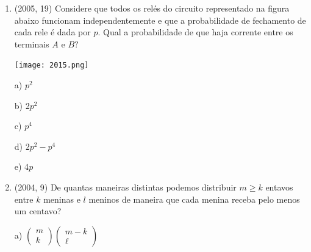 \documentclass{article}
\begin{document}
\begin{enumerate}
c) 48

d) 47

e) 16 \newline

\textbf{RESOLUÇÃO}

$\rule[1cm]{100cm}{1px}$


28+12+5+2+1=47 \newline

d) 47\newline


\textbf{CONTEÚDO}

$\rule[1cm]{100cm}{1px}$

contribuições exclusivas 

Com 7 = 1 cadeia de 7 

Com 6 = 4 - 2x1 =2 cadeias com 6 que não são de 7 

Com 5 = 12 - (3x1 +2x2)= 5 cadeias de 5 que não são de 6 ou 7 

Com 4 = 32 - (4x1 +3x2 + 2x5)= 12 cadeias de 4 

Com 3 = 80- (5x1 +4x2 + 3x5 + 2x12)= 28 cadeias de 3 que não são de 4, 5 ,6 ou7 

Logo a resposta é: 28+12+5+2+1=47 



\newpage




\item(2005, 19) Considere que todos os relés do circuito representado na figura abaixo funcionam independentemente e que a probabilidade de fechamento de cada rele é dada por $p .$ Qual a probabilidade de que haja corrente entre os terminais $A$ e $B ?$

\texttt{[image: 2015.png]}\newline

a) $p^{2}$

b) 2$p^{2}$

c) $p^{4}$

d) $2 p^{2}-p^{4}$

e) 4$p$ \newline







\item(2004, 9) De quantas maneiras distintas podemos distribuir $m \geq k$ entavos entre $k$ meninas e $l$ meninos de maneira que cada menina receba pelo menos um centavo?


a) $\left(\begin{array}{c}{m} \\ {k}\end{array}\right)\left(\begin{array}{c}{m-k} \\ {\ell}\end{array}\right)$


\end{enumerate}
\end{document}

